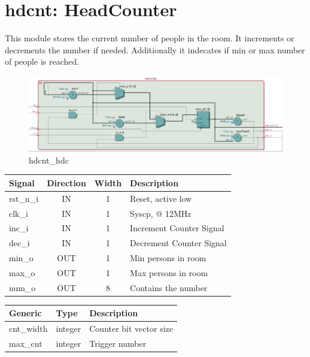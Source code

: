 \documentclass[12pt,a4 paper] {report}
\begin{document}
\newpage

\section{hdcnt: HeadCounter}
This module stores the current number of people in the room. It increments or decrements the number if needed. 
Additionally it indecates if min or max number of people is reached.
\begin{figure}[h]
	\centering	
	\includegraphics[scale=0.3]{../png/hdcnt_hdc.png}
	\caption{hdcnt\_hdc}
\end{figure}
\begin{center}
	\begin{tabular}{ | p{2cm} | c | c | p{5cm} |}
		\hline
		\textbf{Signal} & \textbf{Direction} & \textbf{Width} & \textbf{Description} \\
		\hline	
		rst\_n\_i & IN & 1 & Reset, active low \\
		\hline
		clk\_i & IN & 1 & Syscp, @ 12MHz \\
		\hline
		inc\_i & IN & 1 & Increment Counter Signal \\
		\hline
		dec\_i & IN & 1 & Decrement Counter Signal \\
		\hline
		min\_o & OUT & 1 & Min persons in room \\
		\hline
		max\_o & OUT & 1 & Max persons in room \\
		\hline
		num\_o & OUT & 8 & Contains the number \\
		\hline
	\end{tabular}
\end{center}
\begin{center}
	\begin{tabular}{| p{2cm} | p{2cm} | p{4cm} |}
		\hline
		\textbf{Generic} & \textbf{Type} & \textbf{Description} \\
		\hline
		cnt\_width & integer & Counter bit vector size  \\
		\hline
		max\_cnt & integer & Trigger number \\
		\hline
	\end{tabular}	
\end{center}
\end{document}
